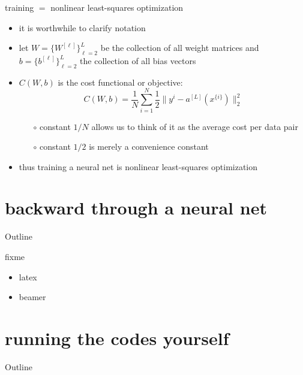\documentclass[xcolor={svgnames},
               hyperref={colorlinks,citecolor=DeepPink4,linkcolor=FireBrick,urlcolor=Maroon}]
               {beamer}
\begin{document}
\begin{frame}{training $=$ nonlinear least-squares optimization}

\begin{itemize}
\item it is worthwhile to clarify notation
\item let $W = \{W^{[\ell]}\}_{\ell=2}^L$ be the collection of all weight matrices and $b=\{b^{[\ell]}\}_{\ell=2}^L$ the collection of all bias vectors
\item $C(W,b)$ is the \alert{cost functional} or \alert{objective}:
    $$C(W,b) = \frac{1}{N} \sum_{i=1}^N \frac{1}{2} \|y^{i} - a^{[L]}(x^{\{i\}})\|_2^2$$

    \begin{itemize}
    \item[$\circ$] constant $1/N$ allows us to think of it as the average cost per data pair
    \item[$\circ$] constant $1/2$ is merely a convenience constant
    \end{itemize}
\item thus training a neural net is \alert{nonlinear least-squares optimization}
\end{itemize}
\end{frame}


\section{backward through a neural net}

\begin{frame}{Outline}
\end{frame}


\begin{frame}{fixme}

\begin{itemize}
\item latex
\item beamer
\end{itemize}
\end{frame}


\section{running the codes yourself}

\begin{frame}{Outline}
\end{frame}
\end{document}
